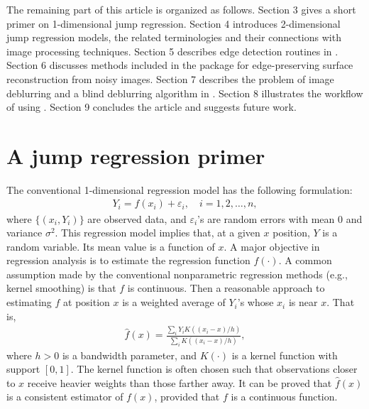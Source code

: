 The remaining part of this article is organized as follows. Section 3 gives a short primer on 1-dimensional jump regression. Section 4 introduces 2-dimensional jump regression models, the related terminologies and their connections with image processing techniques. Section 5 describes edge detection routines in . Section 6 discusses methods included in the package for edge-preserving surface reconstruction from noisy images. Section 7 describes the problem of image deblurring and a blind deblurring algorithm in . Section 8 illustrates the workflow of using . Section 9 concludes the article and suggests future work.

\section{A jump regression primer}\label{sec:primer}

The conventional 1-dimensional regression model has the following formulation:
\begin{align*}
Y_i = f(x_i) + \varepsilon_i, \quad i = 1, 2, \ldots, n,
\end{align*}
where \(\{(x_i, Y_i)\}\) are observed data, and \(\varepsilon_i\)'s are random errors with mean 0 and variance \(\sigma^2\). This regression model implies that, at a given \(x\) position, \(Y\) is a random variable. Its mean value is a function of \(x\). A major objective in regression analysis is to estimate the regression function \(f(\cdot)\). A common assumption made by the conventional nonparametric regression methods (e.g., kernel smoothing) is that \(f\) is continuous. Then a reasonable approach to estimating \(f\) at position \(x\) is a weighted average of \(Y_i\)'s whose \(x_i\) is near \(x\). That is,
\begin{align*}
\widehat{f}(x) = \frac{\sum_{i} Y_i K((x_i - x)/h)}{\sum_{i} K((x_i - x)/h)},
\end{align*}
where \(h>0\) is a bandwidth parameter, and \(K(\cdot)\) is a kernel function with support \([0, 1]\). The kernel function is often chosen such that observations closer to \(x\) receive heavier weights than those farther away. It can be proved that \(\widehat{f}(x)\) is a consistent estimator of \(f(x)\), provided that \(f\) is a continuous function.

